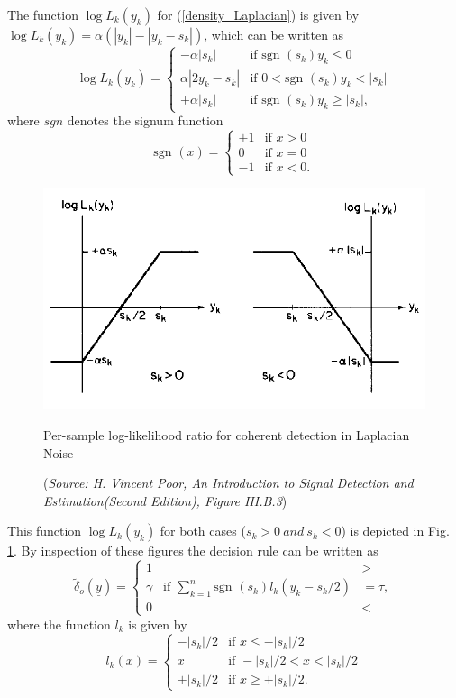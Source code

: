 \documentclass[a4paper,english,12pt]{article}
\begin{document}
\begin{exmp}
The function $\log L_{k}(y_{k})$ for (\ref{density_Laplacian}) is given by $\log L_{k}(y_{k})=\alpha(|y_{k}|-|y_{k}-s_{k}|)$, which can be written as
\begin{equation}
\log L_{k}(y_{k})=\begin{cases}
-\alpha|s_{k}|&\text{if } \text{sgn } (s_{k})y_{k}\leq0\\
\alpha|2y_{k}-s_{k}|&\text{if }0<\text{sgn }(s_{k})y_{k}<|s_{k}|\\
+\alpha|s_{k}|&\text{if }\text{sgn }(s_{k})y_{k}\geq|s_{k}|,
\end{cases}
\end{equation}
where $sgn$ denotes the signum function
\begin{equation}
\text{sgn }(x)=\begin{cases}
+1&\text{if }x>0\\
0&\text{if }x=0\\
-1&\text{if }x<0.
\end{cases}
\end{equation}
\begin{figure}[h]
\centering
\captionsetup{justification=centering}
\includegraphics[width=0.8\linewidth]{Figures/lec10Fig2}
\caption{Per-sample log-likelihood ratio for coherent detection in Laplacian Noise}
\caption*{\footnotesize(\textit{Source: H. Vincent Poor, An Introduction to Signal Detection and Estimation(Second Edition), Figure	 III.B.3})}
\label{fig:Fig2}
\end{figure}


This function $\log L_{k}(y_{k})$ for both cases ($s_{k}>0\ and\ s_{k}<0$) is depicted in Fig. \ref{fig:Fig2}. By inspection of these figures the decision rule can be written as
\begin{equation}
\tilde\delta_{o}(\underline{y})=\begin{cases}
1&>\\
\gamma\hspace{10pt}\text{if }\sum_{k=1}^{n}\text{sgn }(s_{k})l_{k}(y_{k}-s_{k}/2)&=\tau,\\
0&<
\end{cases}
\end{equation}
where the function $l_{k}$ is given by
\begin{equation}
l_{k}(x)=\begin{cases}
-|s_{k}|/2&\text{if }x\leq-|s_{k}|/2\\
x&\text{if }-|s_{k}|/2<x<|s_{k}|/2\\
+|s_{k}|/2&\text{if }x\geq+|s_{k}|/2.
\end{cases}
\end{equation}



\end{exmp}
\end{document}
